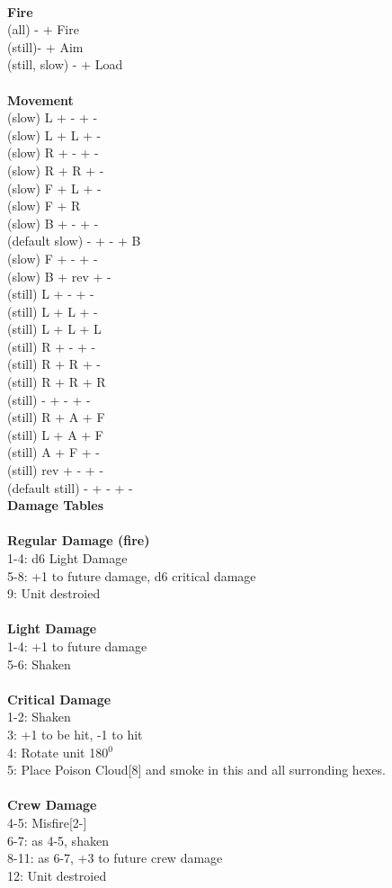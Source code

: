 \ \\ {\bf Fire } \\
(all) - + Fire \\
(still)- + Aim \\
(still, slow) - + Load \\
\ \\ {\bf Movement } \\
(slow) L + - + - \\
(slow) L + L + - \\
(slow) R + - + - \\
(slow) R + R + - \\
(slow) F + L + - \\
(slow) F + R \\
(slow) B + - + - \\
(default slow) - + - + B \\
(slow) F + - + - \\
(slow) B + rev + - \\
(still) L + - + - \\
(still) L + L + - \\
(still) L + L + L \\
(still) R + - + - \\
(still) R + R + - \\
(still) R + R + R \\
(still) - + - + - \\
(still) R + A + F \\
(still) L + A + F \\
(still) A + F + - \\
(still) rev + - + - \\
(default still) - + - + - \\



{\bf Damage Tables} \\
\ \\ {\bf Regular Damage (fire) } \\
1-4: d6 Light Damage \\
5-8: +1 to future damage, d6 critical damage \\
9: Unit destroied \\
\ \\ {\bf Light Damage } \\
1-4: +1 to future damage \\
5-6: Shaken \\
\ \\ {\bf Critical Damage } \\
1-2: Shaken \\
3: +1 to be hit, -1 to hit \\
4: Rotate unit 180$^0$ \\
5: Place Poison Cloud[8] and smoke in this and all surronding hexes. \\
\ \\ {\bf Crew Damage } \\
4-5: Misfire[2-] \\
6-7: as 4-5, shaken \\
8-11: as 6-7, +3 to future crew damage \\
12: Unit destroied \\


